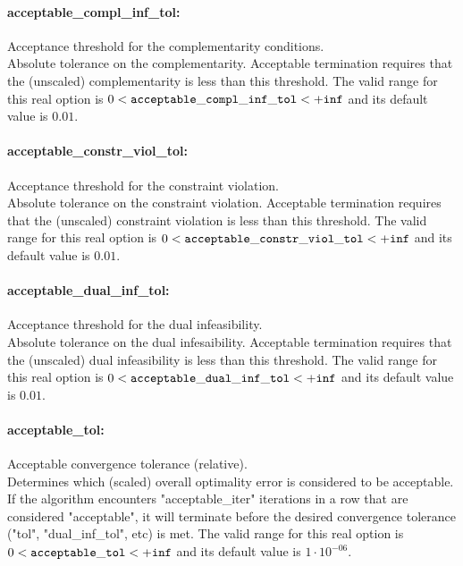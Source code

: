 \documentclass[letter,10pt]{article}
\begin{document}
\paragraph{acceptable\_compl\_inf\_tol:} Acceptance threshold for the complementarity conditions. $\;$ \\
 Absolute tolerance on the complementarity.
Acceptable termination requires that the
(unscaled) complementarity is less than this
threshold. The valid range for this real option is 
$0 <  {\tt acceptable\_compl\_inf\_tol } <  {\tt +inf}$
and its default value is $0.01$.


\paragraph{acceptable\_constr\_viol\_tol:} Acceptance threshold for the constraint violation. $\;$ \\
 Absolute tolerance on the constraint violation.
Acceptable termination requires that the
(unscaled) constraint violation is less than this
threshold. The valid range for this real option is 
$0 <  {\tt acceptable\_constr\_viol\_tol } <  {\tt +inf}$
and its default value is $0.01$.


\paragraph{acceptable\_dual\_inf\_tol:} Acceptance threshold for the dual infeasibility. $\;$ \\
 Absolute tolerance on the dual infesaibility.
Acceptable termination requires that the
(unscaled) dual infeasibility is less than this
threshold. The valid range for this real option is 
$0 <  {\tt acceptable\_dual\_inf\_tol } <  {\tt +inf}$
and its default value is $0.01$.


\paragraph{acceptable\_tol:} Acceptable convergence tolerance (relative). $\;$ \\
 Determines which (scaled) overall optimality
error is considered to be acceptable. If the
algorithm encounters "acceptable\_iter"
iterations in a row that are considered
"acceptable", it will terminate before the
desired convergence tolerance ("tol",
"dual\_inf\_tol", etc) is met. The valid range for this real option is 
$0 <  {\tt acceptable\_tol } <  {\tt +inf}$
and its default value is $1 \cdot 10^{-06}$.
\end{document}
